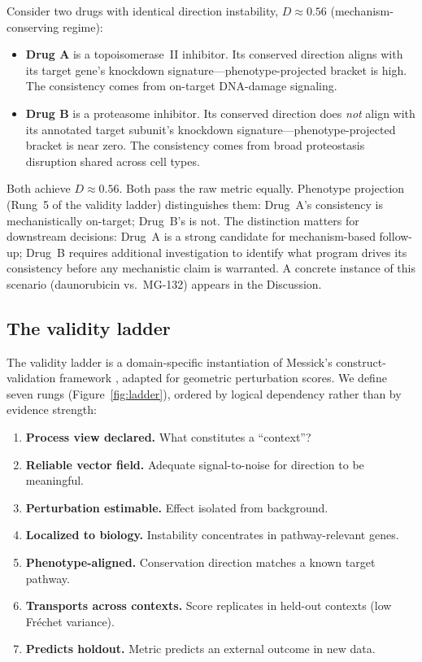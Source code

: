 \documentclass[11pt]{article}
\begin{document}
Consider two drugs with identical direction instability, $D \approx 0.56$
(mechanism-conserving regime):

\begin{itemize}
  \item \textbf{Drug A} is a topoisomerase~II inhibitor. Its conserved
    direction aligns with its target gene's knockdown
    signature---phenotype-projected bracket is high. The consistency comes
    from on-target DNA-damage signaling.
  \item \textbf{Drug B} is a proteasome inhibitor. Its conserved direction
    does \emph{not} align with its annotated target subunit's knockdown
    signature---phenotype-projected bracket is near zero. The consistency
    comes from broad proteostasis disruption shared across cell types.
\end{itemize}

Both achieve $D \approx 0.56$. Both pass the raw metric equally. Phenotype
projection (Rung~5 of the validity ladder) distinguishes them: Drug~A's
consistency is mechanistically on-target; Drug~B's is not. The distinction
matters for downstream decisions: Drug~A is a strong candidate for
mechanism-based follow-up; Drug~B requires additional investigation to
identify what program drives its consistency before any mechanistic claim
is warranted. A concrete instance of this scenario (daunorubicin vs.\
MG-132) appears in the Discussion.

\subsection{The validity ladder}

The validity ladder is a domain-specific instantiation of Messick's
construct-validation framework \citep{messick1995validity}, adapted for
geometric perturbation scores. We define seven rungs
(Figure~\ref{fig:ladder}), ordered by logical dependency rather than by
evidence strength:

\begin{enumerate}
  \item \textbf{Process view declared.} What constitutes a ``context''?
  \item \textbf{Reliable vector field.} Adequate signal-to-noise for
    direction to be meaningful.
  \item \textbf{Perturbation estimable.} Effect isolated from background.
  \item \textbf{Localized to biology.} Instability concentrates in
    pathway-relevant genes.
  \item \textbf{Phenotype-aligned.} Conservation direction matches a
    known target pathway.
  \item \textbf{Transports across contexts.} Score replicates in held-out
    contexts (low Fr\'echet variance).
  \item \textbf{Predicts holdout.} Metric predicts an external outcome
    in new data.
\end{enumerate}
\end{document}
